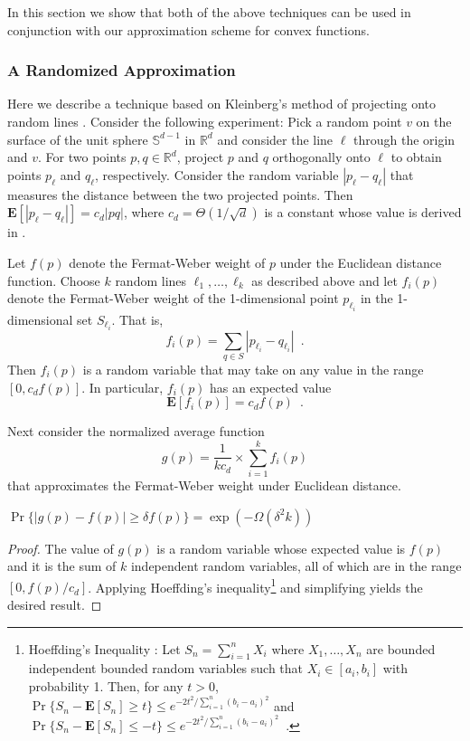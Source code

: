 \documentclass[charterfonts,lotsofwhite]{patmorin}
\newcommand{\E}{\mathbf{E}}
\begin{document}
In this section we show that both of the above techniques can be used
in conjunction with our approximation scheme for convex functions.


\subsubsection{A Randomized Approximation}

Here we describe a technique based on Kleinberg's method of projecting
onto random lines \cite{k97}.  Consider the following experiment: Pick
a random point $v$ on the surface of the unit sphere
$\mathbb{S}^{d-1}$ in $\mathbb{R}^d$ and consider the line $\ell$
through the origin and $v$. For two points $p,q\in\mathbb{R}^d$,
project $p$ and $q$ orthogonally onto $\ell$ to obtain points $p_\ell$
and $q_\ell$, respectively. Consider the random variable
$|p_\ell-q_\ell|$ that measures the distance between the two projected
points.  Then $\E[|p_\ell-q_\ell|]=c_d|pq|$, where
$c_d=\Theta(1/\sqrt{d})$ is a constant whose value is derived in
.  

Let $f(p)$ denote the Fermat-Weber weight of $p$ under the Euclidean
distance function.  Choose $k$ random lines $\ell_1,\ldots,\ell_k$ as
described above and let $f_i(p)$ denote the Fermat-Weber weight of the
1-dimensional point $p_{\ell_i}$ in the 1-dimensional set
$S_{\ell_i}$.  That is,
\[
     f_i(p) = \sum_{q\in S} |p_{\ell_i}-q_{\ell_i}| \enspace .
\]
Then $f_i(p)$ is a random variable that may take on any value in the
range $[0,c_df(p)]$.  In particular, $f_i(p)$ has an expected value 
\[
   \E[f_i(p)]=c_df(p) \enspace . 
\] 

Next consider the normalized average function 
\[ g(p) = \frac{1}{kc_d}\times\sum_{i=1}^k f_i(p) \] 
that approximates the
Fermat-Weber weight under Euclidean distance.

\begin{lem}
$\Pr\{|g(p)-f(p)| \ge \delta f(p)\} = \exp(-\Omega(\delta^2k))$
\end{lem}

\begin{proof}
The value of $g(p)$ is a random variable whose expected value is
$f(p)$ and it is the sum of $k$ independent random variables, all of
which are in the range $[0,f(p)/c_d]$.  Applying Hoeffding's
inequality\footnote{Hoeffding's Inequality \cite{h63}: Let
$S_n=\sum_{i=1}^n X_i$ where $X_1,\ldots,X_n$ are
bounded independent bounded random variables such that $X_i\in[a_i,b_i]$ with probability 1.  Then, for any $t>0$,
$
    \Pr\{S_n - \E[S_n] \ge t\} 
   \le e^{-2t^2/\sum_{i=1}^n(b_i-a_i)^2}
$
and
$
    \Pr\{S_n - \E[S_n] \le -t\} 
   \le e^{-2t^2/\sum_{i=1}^n(b_i-a_i)^2} \enspace .
$
} and simplifying yields the desired
result.
\end{proof}
\end{document}
